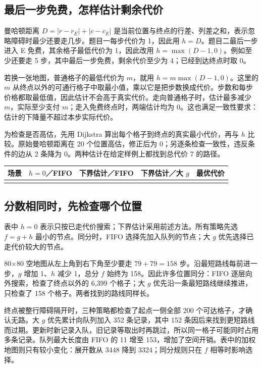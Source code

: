 \documentclass[UTF8,a4paper,10pt,fontset=fandol]{ctexart}
\begin{document}
\subsection{最后一步免费，怎样估计剩余代价}
曼哈顿距离 $D=|r-r_E|+|c-c_E|$ 是当前位置与终点的行差、列差之和，表示忽略障碍时最少还要走几步。题目一每步代价为 1，因此用 $h=D$。题目二最后一步进入 E 免费，其余格子最低代价为 1，因此改用 $h=\max(D-1,0)$。例如至少还要走 5 步，其中最后一步免费，剩余代价至少为 4；已经到达终点时取 0。

若换一张地图，普通格子的最低代价为 $m$，就用 $h=m\max(D-1,0)$。这里的 $m$ 从终点以外的可通行格子中取最小值，乘以它是把步数换成代价。步数和每步价格都取最低值，因此估计不会高于真实代价。走向普通格子时，估计最多减少 $m$，实际至少支付 $m$；走入免费终点时，两端估计均为 0。这也满足一致性要求：估计的下降量不超过本步实际代价。

为检查是否高估，先用 Dijkstra 算出每个格子到终点的真实最小代价，再与 $h$ 比较。原始曼哈顿距离在 20 个位置高估，修正后为 0；另逐条检查一致性，违反条件的边从 2 条降为 0。两种估计在给定样例上都找到总代价 7 的路径。

\begin{center}\small
{}
\begin{tabular}{lrrrr}
\toprule 场景 & $h=0$／FIFO & 下界估计／FIFO & 下界估计／大 $g$ & 最优代价\\\midrule
\\\bottomrule
\end{tabular}\end{center}

\subsection{分数相同时，先检查哪个位置}
表中 $h=0$ 表示只按已走代价搜索；下界估计采用前述方法。所有策略先选 $f=g+h$ 最小的节点。同分时，FIFO 选择先加入队列的节点；大 $g$ 优先选择已走代价较大的节点。

80×80 空地图从左上角到右下角至少要走 $79+79=158$ 步。沿最短路线每前进一步，$g$ 增加 1、$h$ 减少 1，总分 $f$ 始终为 158。因此许多位置同分：FIFO 逐层向外搜索，检查了终点以外的 6,399 个格子；大 $g$ 优先沿一条最短路线继续推进，只检查了 158 个格子。两者找到的路线同样长。

终点被整行障碍隔开时，三种策略都检查了起点一侧全部 200 个可达格子，才确认无路。大 $g$ 优先累计向队列加入 352 条记录，其中 152 条因后来找到更短路线而过期。更新时新记录入队，旧记录等取出时再跳过，所以同一格子可能同时占用多条记录。队列最大长度由 FIFO 的 11 增至 153，增加了空间开销。表中的加权地图则只有较小变化：展开数从 3448 降到 3324；同分规则只在 $f$ 相等时影响选择。
\end{document}
